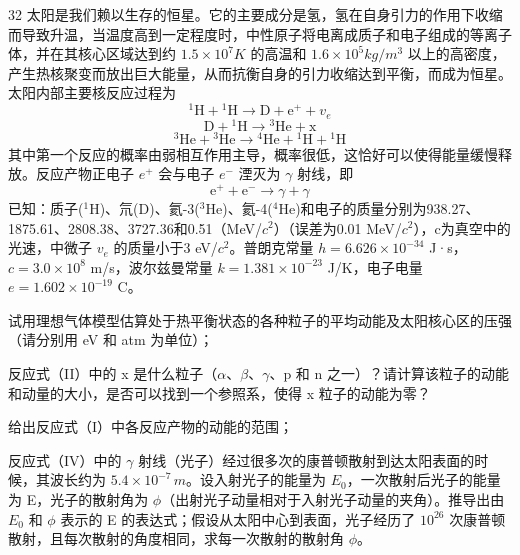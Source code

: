 \begin{problem}[理论考试][太阳内部核反应]{32}
  太阳是我们赖以生存的恒星。它的主要成分是氢，氢在自身引力的作用下收缩而导致升温，当温度高到一定程度时，中性原子将电离成质子和电子组成的等离子体，并在其核心区域达到约 $1.5\times10^{7}K$ 的高温和 $1.6\times10^{5}kg/m^{3}$ 以上的高密度，产生热核聚变而放出巨大能量，从而抗衡自身的引力收缩达到平衡，而成为恒星。太阳内部主要核反应过程为
  \begin{equation}
    {}^{1}\mathrm{H} + {}^{1}\mathrm{H} \rightarrow \mathrm{D} + \mathrm{e}^{+} + v_{e}
    \label{eq:I.32}
  \end{equation}
  \begin{equation}
    \mathrm{D} + {}^{1}\mathrm{H} \rightarrow {}^{3}\mathrm{He} + \mathrm{x}
    \label{eq:II.32}
  \end{equation}
  \begin{equation}
    {}^{3}\mathrm{He} + {}^{3}\mathrm{He} \rightarrow {}^{4}\mathrm{He} + {}^{1}\mathrm{H} + {}^{1}\mathrm{H}
    \label{eq:III.32}
  \end{equation}
  其中第一个反应的概率由弱相互作用主导，概率很低，这恰好可以使得能量缓慢释放。反应产物正电子 $e^{+}$ 会与电子 $e^{-}$ 湮灭为 $\gamma$ 射线，即
  \begin{equation}
    \mathrm{e}^{+} + \mathrm{e}^{-} \rightarrow \gamma + \gamma
    \label{eq:IV.32}
  \end{equation}
  已知：质子($^{1}$H)、氘(D)、氦-3($^{3}$He)、氦-4($^{4}$He)和电子的质量分别为938.27、1875.61、2808.38、3727.36和0.51（MeV/$c^{2}$）（误差为0.01 MeV/$c^{2}$），c为真空中的光速，中微子 $v_{e}$ 的质量小于3 eV/$c^{2}$。普朗克常量 $h=6.626\times10^{-34}$ J·s，$c=3.0\times10^{8}$ m/s，波尔兹曼常量 $k=1.381\times10^{-23}$ J/K，电子电量 $e=1.602\times10^{-19}$ C。

  \begin{subproblem}
    试用理想气体模型估算处于热平衡状态的各种粒子的平均动能及太阳核心区的压强（请分别用 eV 和 atm 为单位）；
  \end{subproblem}
  \begin{subproblem}
    反应式（II）中的 x 是什么粒子（$\alpha$、$\beta$、$\gamma$、p 和 n 之一）？请计算该粒子的动能和动量的大小，是否可以找到一个参照系，使得 x 粒子的动能为零？
  \end{subproblem}
  \begin{subproblem}
    给出反应式（I）中各反应产物的动能的范围；
  \end{subproblem}
  \begin{subproblem}
    反应式（IV）中的 $\gamma$ 射线（光子）经过很多次的康普顿散射到达太阳表面的时候，其波长约为 $5.4 \times 10^{-7} \, m$。设入射光子的能量为 $E_{0}$，一次散射后光子的能量为 E，光子的散射角为 $\phi$（出射光子动量相对于入射光子动量的夹角）。推导出由 $E_{0}$ 和 $\phi$ 表示的 E 的表达式；假设从太阳中心到表面，光子经历了 $10^{26}$ 次康普顿散射，且每次散射的角度相同，求每一次散射的散射角 $\phi$。
  \end{subproblem}
\end{problem}